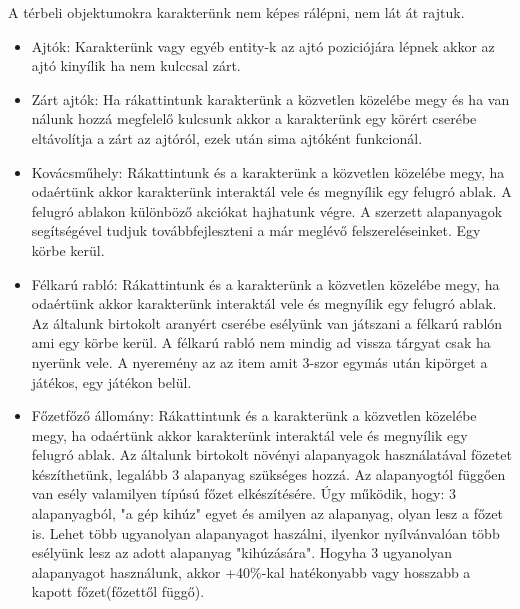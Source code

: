 A térbeli objektumokra karakterünk nem képes rálépni, nem lát át rajtuk.
\begin{itemize}
\item
Ajtók: Karakterünk vagy egyéb entity-k az ajtó poziciójára lépnek akkor az ajtó kinyílik ha nem kulccsal zárt.
\item
Zárt ajtók: Ha rákattintunk karakterünk a közvetlen közelébe megy és ha van nálunk hozzá megfelelő kulcsunk akkor a karakterünk egy körért cserébe eltávolítja a zárt az ajtóról, ezek után sima ajtóként funkcionál.
\item
Kovácsműhely: Rákattintunk és a karakterünk a közvetlen közelébe megy, ha odaértünk akkor karakterünk interaktál vele és megnyílik egy felugró ablak. A felugró ablakon különböző akciókat hajhatunk végre. A szerzett alapanyagok segítségével tudjuk továbbfejleszteni a már meglévő felszereléseinket. Egy körbe kerül.


\item
Félkarú rabló: Rákattintunk és a karakterünk a közvetlen közelébe megy, ha odaértünk akkor karakterünk interaktál vele és megnyílik egy felugró ablak. Az általunk birtokolt aranyért cserébe esélyünk van játszani a félkarú rablón ami egy körbe kerül. A félkarú rabló nem mindig ad vissza tárgyat csak ha nyerünk vele. A nyeremény az az item amit 3-szor egymás után kipörget a játékos, egy játékon belül.




\item
Főzetfőző állomány: Rákattintunk és a karakterünk a közvetlen közelébe megy, ha odaértünk akkor karakterünk interaktál vele és megnyílik egy felugró ablak. Az általunk birtokolt növényi alapanyagok használatával fözetet készíthetünk, legalább 3 alapanyag szükséges hozzá. Az alapanyogtól függően van esély valamilyen típúsú főzet elkészítésére. Úgy működik, hogy: 3 alapanyagból, "a gép kihúz" egyet és amilyen az alapanyag, olyan lesz a főzet is. Lehet több ugyanolyan alapanyagot haszálni, ilyenkor nyílvánvalóan több esélyünk lesz az adott alapanyag "kihúzására". Hogyha 3 ugyanolyan alapanyagot használunk, akkor +40\%-kal hatékonyabb vagy hosszabb a kapott főzet(főzettől függő).


\end{itemize}

